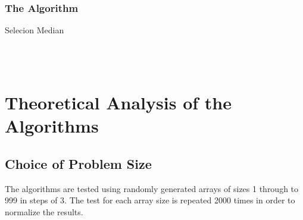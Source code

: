 \documentclass{article}
\begin{document}
        \subsubsection{The Algorithm}
            \begin{algorithm}[H]
                \caption{Selecion Median}
                \begin{algorithmic}[1]
                    \Function{Median}{$A[0..n - 1$}
                        \Else
                        \EndIf
                    \EndFunction\\

                        \EndIf
                        \EndIf
                        \EndIf
                    \EndFunction\\


                            \EndIf
                        \EndFor
                    \EndFunction
                \end{algorithmic}
            \end{algorithm}


\section{Theoretical Analysis of the Algorithms}
    \subsection{Choice of Problem Size}
        The algorithms are tested using randomly generated arrays of sizes 1 through to 999 in steps of 3. The test for each array size is repeated 2000 times in order to normalize the results.
\end{document}
